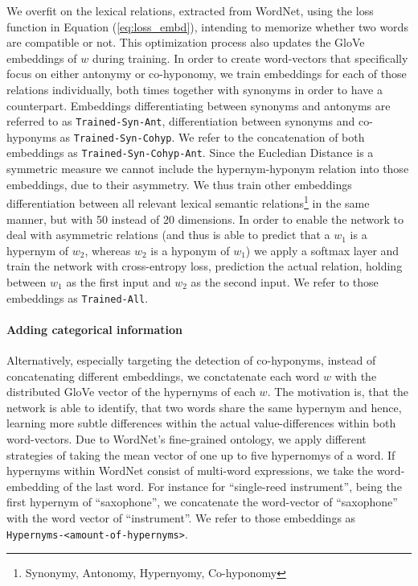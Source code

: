 We overfit on the lexical relations, extracted from WordNet, using the loss function in Equation (\ref{eq:loss_embd}), intending to memorize whether two words are compatible or not. This optimization process also updates the GloVe embeddings of $w$ during training. In order to create word-vectors that specifically focus on either antonymy or co-hyponomy, we train embeddings for each of those relations individually, both times together with synonyms in order to have a counterpart. Embeddings differentiating between synonyms and antonyms are referred to as \texttt{Trained-Syn-Ant}, differentiation between synonyms and co-hyponyms as \texttt{Trained-Syn-Cohyp}. We refer to the concatenation of both embeddings as \texttt{Trained-Syn-Cohyp-Ant}. Since the Eucledian Distance is a symmetric measure we cannot include the hypernym-hyponym relation into those embeddings, due to their asymmetry. We thus train other embeddings differentiation between all relevant lexical semantic relations\footnote{Synonymy, Antonomy, Hypernyomy, Co-hyponomy} in the same manner, but with 50 instead of 20 dimensions. In order to enable the network to deal with asymmetric relations (and thus is able to predict that a $w_1$ is a hypernym of $w_2$, whereas $w_2$ is a hyponym of $w_1$) we apply a softmax layer and train the network with cross-entropy loss, prediction the actual relation, holding between $w_1$ as the first input and $w_2$ as the second input. We refer to those embeddings as \texttt{Trained-All}.
\paragraph*{Adding categorical information}
Alternatively, especially targeting the detection of co-hyponyms, instead of concatenating different embeddings, we conctatenate each word $w$ with the distributed GloVe vector of the hypernyms of each $w$. The motivation is, that the network is able to identify, that two words share the same hypernym and hence, learning more subtle differences within the actual value-differences within both word-vectors. Due to WordNet's fine-grained ontology, we apply different strategies of taking the mean vector of one up to five hypernomys of a word. If hypernyms within WordNet consist of multi-word expressions, we take the word-embedding of the last word. For instance for ``single-reed instrument'', being the first hypernym of ``saxophone'', we concatenate the word-vector of ``saxophone'' with the word vector of ``instrument''. We refer to those embeddings as \texttt{Hypernyms-<amount-of-hypernyms>}.
